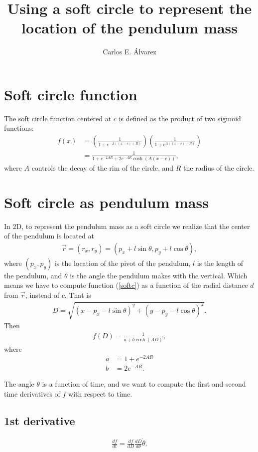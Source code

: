\documentclass[12pt]{article}
\begin{document}
\title{Using a soft circle to represent the location of the pendulum mass}
\author{Carlos E. \'Alvarez}
\maketitle

\section{Soft circle function}
The soft circle function centered at $c$ is defined as the product of two sigmoid functions:
\begin{align}
  f(x)&=\left(\frac{1}{1+e^{-A((x-c)+R)}}\right)\left(\frac{1}{1+e^{A((x-c)-R)}}\right)\nonumber\\
  &=\frac{1}{1+e^{-2AR}+2e^{-AR}\cosh(A(x-c))},
  \label{softc}
\end{align}
where $A$ controls the decay of the rim of the circle, and $R$ the radius of the circle.\\

\section{Soft circle as pendulum mass}
In 2D, to represent the pendulum mass as a soft circle we realize that the center of the pendulum is located at
\begin{align}
  \vec{r}=(r_x,r_y)=(p_x+l\sin\theta,p_y+l\cos\theta),
\end{align}
where $(p_x,p_y)$ is the location of the pivot of the pendulum, $l$ is the length of the pendulum, and $\theta$ is the angle the pendulum makes with the vertical. Which means we have to compute function (\ref{softc}) as a function of the radial distance $d$ from $\vec{r}$, instead of $c$. That is
\begin{align}
  D = \sqrt{(x-p_x-l\sin\theta)^2+(y-p_y-l\cos\theta)^2}.
\end{align}
Then
\begin{align}
  f(D) = \frac{1}{a+b\cosh(AD)},
\end{align}
where
\begin{align}
  a &= 1+e^{-2AR}\\
  b &= 2e^{-AR}.
\end{align}

The angle $\theta$ is a function of time, and we want to compute the first and second time derivatives of $f$ with respect to time.

\subsection{1st derivative}
\begin{align}
  \frac{df}{dt}=\frac{df}{dD}\frac{dD}{d\theta}\dot{\theta}.
\end{align}
\end{document}
